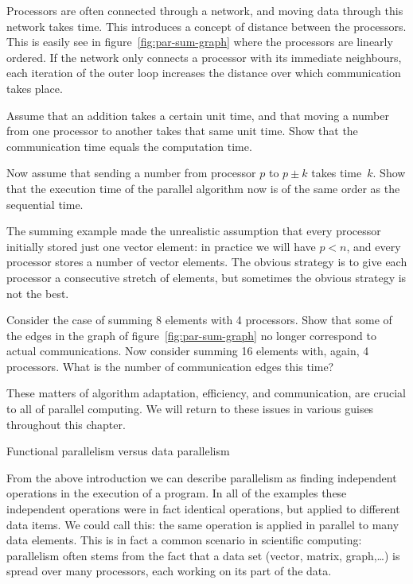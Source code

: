 Processors are often connected through a network, and moving data
through this network takes time. This introduces a concept of distance
between the processors. This is easily see in figure~\ref{fig:par-sum-graph}
where the
processors are linearly ordered. If the network only connects a
processor with its immediate neighbours,  each iteration of the
outer loop increases the distance over which communication takes
place.

\begin{exercise}
  \label{ex:summing0}
  Assume that an addition takes a certain unit time, and that moving a
  number from one processor to another takes that same unit time. Show
  that the communication time equals the computation time.

  Now assume that sending a number from processor $p$ to $p\pm k$
  takes time~$k$. Show that the execution time of the parallel
  algorithm now is of the same order as the sequential time.
\end{exercise}

The summing example made the unrealistic assumption that every
processor initially stored just one vector element: in practice we will
have $p<n$, and every processor stores a number of vector
elements. The obvious strategy is to give each processor a consecutive
stretch of elements, but sometimes the obvious strategy is not the
best.

\begin{exercise}
  Consider the case of summing 8 elements with 4 processors. Show that
  some of the edges in the graph of figure~\ref{fig:par-sum-graph} no
  longer correspond to actual communications. 
  Now consider summing 16 elements with, again, 4 processors. What is
  the number of communication edges this time?
\end{exercise}

These matters of algorithm adaptation, efficiency, and communication,
are crucial to all of parallel computing. We will return to these
issues in various guises throughout this chapter.

 {Functional parallelism versus data parallelism}

From the above introduction we can describe parallelism as finding
independent operations in the execution of a program. In all of the examples
these independent operations were in fact identical operations, but applied to
different data items. We could call this: the same
operation is applied in parallel to many data elements.
This is in fact a common scenario in scientific computing: parallelism
often stems from the fact that a data set (vector, matrix,
graph,\ldots) is spread over many processors, each working on its part
of the data. 


